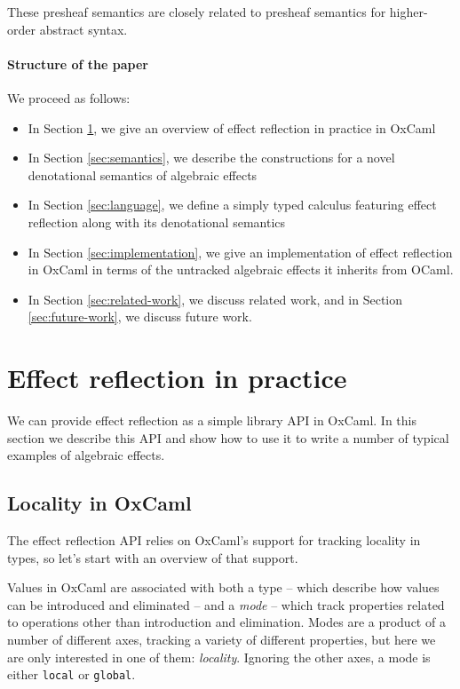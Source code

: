 \documentclass[acmsmall, screen, nonacm]{acmart}
\theoremstyle{definition}
\begin{document}
These presheaf semantics are closely related to presheaf semantics for
higher-order abstract syntax\cite{??}.

\paragraph{Structure of the paper} We proceed as follows:
\begin{itemize}
\item In Section \ref{sec:pracice}, we give an overview of effect reflection in
  practice in OxCaml
\item In Section \ref{sec:semantics}, we describe the constructions for a
  novel denotational semantics of algebraic effects
\item In Section \ref{sec:language}, we define a simply typed calculus featuring
  effect reflection along with its denotational semantics
\item In Section \ref{sec:implementation}, we give an implementation of effect
  reflection in OxCaml in terms of the untracked algebraic effects it
  inherits from OCaml.
\item In Section \ref{sec:related-work}, we discuss related work, and in
  Section \ref{sec:future-work}, we discuss future work.
\end{itemize}

\section{Effect reflection in practice}
\label{sec:pracice}

We can provide effect reflection as a simple library API in OxCaml. In
this section we describe this API and show how to use it to write a
number of typical examples of algebraic effects.

\subsection{Locality in OxCaml}

The effect reflection API relies on OxCaml's support for tracking
locality in types, so let's start with an overview of that support.

Values in OxCaml are associated with both a type -- which describe how
values can be introduced and eliminated -- and a \emph{mode} -- which
track properties related to operations other than introduction and
elimination. Modes are a product of a number of different axes, tracking
a variety of different properties, but here we are only interested in
one of them: \emph{locality}. Ignoring the other axes, a mode is either
\lstinline[style=ocaml]{local} or \lstinline[style=ocaml]{global}.
\end{document}
